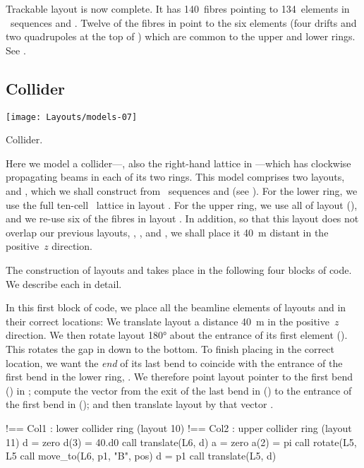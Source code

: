 Trackable layout  is now complete. It has 140~fibres
pointing to 134~elements in \DNA\ sequences  and .
Twelve of the fibres in  point to the six elements (four
drifts and two quadrupoles at the top of ) which are common
to the upper and lower rings. See .


\subsection{Collider}

\begin{MarginFigure}
  \texttt{[image: Layouts/models-07]}
  \caption{Collider.}
  \label{fig:col1.col2}
\end{MarginFigure}

%
Here we model a collider---, also the right-hand
lattice in ---which has clockwise propagating
beams in each of its two rings. This model comprises two layouts,
 and , which we shall construct from
\DNA\ sequences  and  (see ). For
the lower ring, we use the full ten-cell \PSR\ lattice in layout
. For the upper ring, we use all of layout 
(), and we re-use six of the fibres in layout
.%
In addition, so that this layout does not overlap our previous
layouts, , , and , we shall place
it \SI{40}{m} distant in the positive~$z$ direction.

The construction of layouts  and  takes place
in the following four blocks of code. We describe each in detail.

In this first block of code, we place all the beamline elements of
layouts  and  in their correct locations: We
translate layout  a distance \SI{40}{m} in the positive~$z$
direction. We then rotate layout  \ang{180} about the
entrance of its first element (). This
rotates the gap in  down to the bottom. To finish placing
 in the correct location, we want the \emph{end} of its
last bend to coincide with the entrance of the first bend in the
lower ring, . We therefore point layout pointer 
to the first bend () in ; compute the vector
 from the exit of the last bend in 
() to the entrance of the first bend in
 (); and then translate layout 
by that vector .
%
\begin{ptccode}
!== Col1 : lower collider ring (layout 10)
!== Col2 : upper collider ring (layout 11)
d = zero
d(3) = 40.d0
call translate(L6, d)
a = zero
a(2) = pi
call rotate(L5, L5%
call move_to(L6, p1, "B", pos)
d = p1%
call translate(L5, d)
\end{ptccode}

